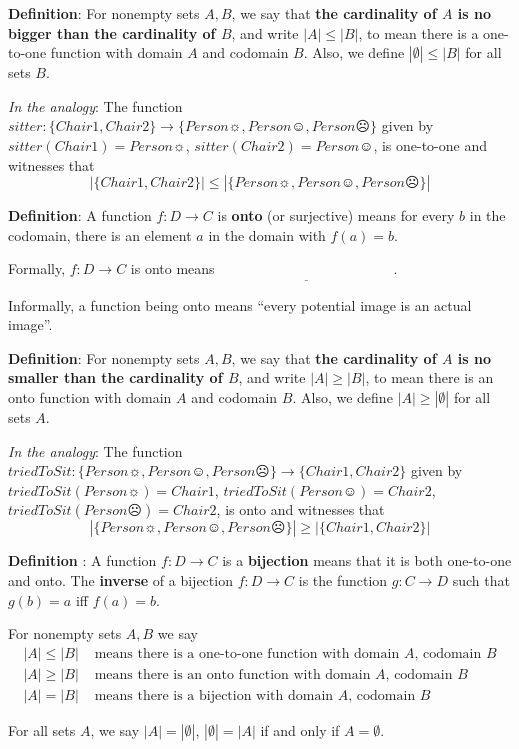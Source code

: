 \documentclass[12pt, oneside]{article}
\begin{document}
\phantom{Draw finite domain, finite codomain picture with duplicate image.}
\vspace{50pt} 

{\bf Definition}:  For nonempty sets $A, B$, we say that {\bf the  cardinality of $A$ is  no  bigger than the cardinality of $B$}, 
and write $|A| \leq |B|$, to mean there is a  one-to-one function  with domain $A$  and codomain $B$.
Also, we define $|\emptyset| \leq |B|$ for all sets $B$. 

{\it In the analogy}: The function $sitter: \{ Chair1, Chair2\} \to \{ Person\sun, Person\smiley, Person\frownie \}$ given
by $sitter(Chair1) = Person\sun$,  $sitter(Chair2) = Person\smiley$, is one-to-one and witnesses that 
\[
| \{ Chair1, Chair2\} | \leq |\{ Person\sun, Person\smiley, Person\frownie \}|
\] \newpage


{\bf Definition}: A function $f: D  \to C$ is {\bf onto} (or  surjective) means for every $b$ in the codomain, 
there  is an element $a$ in the domain with  $f(a) = b$.

Formally, $f: D  \to  C$ is  onto  means $\underline{\phantom{\forall b \in C  \exists a \in D ( f(a) = b)}}$.
 

Informally, a function being onto means ``every potential image is an actual image''.

\phantom{Draw finite domain, finite codomain picture with duplicate image.}
\vspace{50pt} 

{\bf Definition}:  For nonempty sets $A, B$, we say that {\bf the  cardinality of $A$ is  no  smaller than 
the cardinality of  $B$}, and 
write $|A| \geq |B|$, to mean there is an onto function  with domain $A$  and codomain $B$.
Also, we define $|A| \geq |\emptyset|$ for all sets $A$.
 

{\it In the analogy}: The function $triedToSit: \{ Person\sun, Person\smiley, Person\frownie \} \to  \{ Chair1, Chair2\} $ given
by $triedToSit(Person\sun) = Chair1$,  $triedToSit(Person\smiley) = Chair2$, 
$triedToSit(Person\frownie) = Chair2$, is onto and witnesses that 
\[
 |\{ Person\sun, Person\smiley, Person\frownie \}| \geq | \{ Chair1, Chair2\} |
\] \vfill


{\bf Definition} : A function $f: D  \to C$ is a {\bf bijection} means that it is both 
one-to-one  and onto. The {\bf inverse} of a  bijection $f: D  \to  C$ is 
the function $g: C  \to  D$  such that $g(b) = a$ iff  $f(a) =  b$.
 \vfill


\vfill


For nonempty sets $A, B$ we say
\begin{align*}
|A| \leq |B| &\text{ means there is a one-to-one function with domain $A$, codomain $B$} \\
|A| \geq |B| &\text{ means there is an onto function with domain $A$, codomain $B$} \\
|A| = |B| &\text{ means there is a bijection with domain $A$, codomain $B$}
\end{align*}

For all sets $A$, we say $|A| = |\emptyset|$, $|\emptyset| = |A|$ if and only if $A = \emptyset$. 

\newpage
\end{document}

